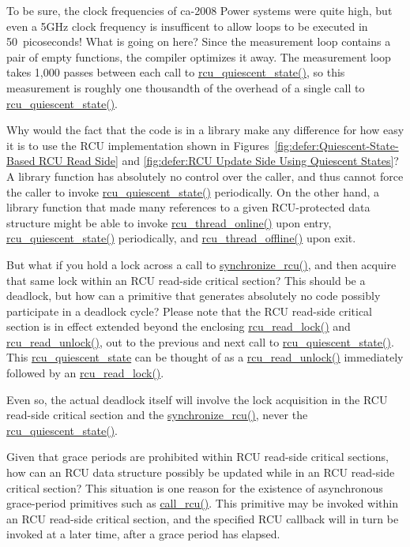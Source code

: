 \QuickQ{}
	To be sure, the clock frequencies of ca-2008 Power
	systems were quite high, but even a 5GHz clock
	frequency is insufficent to allow
	loops to be executed in 50~picoseconds!
	What is going on here?
\QuickA{}
	Since the measurement loop contains a pair of empty functions,
	the compiler optimizes it away.
	The measurement loop takes 1,000 passes between each call to
	\url{rcu_quiescent_state()}, so this measurement is roughly
	one thousandth of the overhead of a single call to
	\url{rcu_quiescent_state()}.

\QuickQ{}
	Why would the fact that the code is in a library make
	any difference for how easy it is to use the RCU
	implementation shown in
	Figures~\ref{fig:defer:Quiescent-State-Based RCU Read Side} and
	\ref{fig:defer:RCU Update Side Using Quiescent States}?
\QuickA{}
	A library function has absolutely no control over the caller,
	and thus cannot force the caller to invoke \url{rcu_quiescent_state()}
	periodically.
	On the other hand, a library function that made many references
	to a given RCU-protected data structure might be able to invoke
	\url{rcu_thread_online()} upon entry,
	\url{rcu_quiescent_state()} periodically, and
	\url{rcu_thread_offline()} upon exit.

\QuickQ{}
	But what if you hold a lock across a call to
	\url{synchronize_rcu()}, and then acquire that same lock within
	an RCU read-side critical section?
	This should be a deadlock, but how can a primitive that
	generates absolutely no code possibly participate in a
	deadlock cycle?
\QuickA{}
	Please note that the RCU read-side critical section is in
	effect extended beyond the enclosing
	\url{rcu_read_lock()} and \url{rcu_read_unlock()}, out to
	the previous and next call to \url{rcu_quiescent_state()}.
	This \url{rcu_quiescent_state} can be thought of as a
	\url{rcu_read_unlock()} immediately followed by an
	\url{rcu_read_lock()}.

	Even so, the actual deadlock itself will involve the lock
	acquisition in the RCU read-side critical section and
	the \url{synchronize_rcu()}, never the \url{rcu_quiescent_state()}.

\QuickQ{}
	Given that grace periods are prohibited within RCU read-side
	critical sections, how can an RCU data structure possibly be
	updated while in an RCU read-side critical section?
\QuickA{}
	This situation is one reason for the existence of asynchronous
	grace-period primitives such as \url{call_rcu()}.
	This primitive may be invoked within an RCU read-side critical
	section, and the specified RCU callback will in turn be invoked
	at a later time, after a grace period has elapsed.

